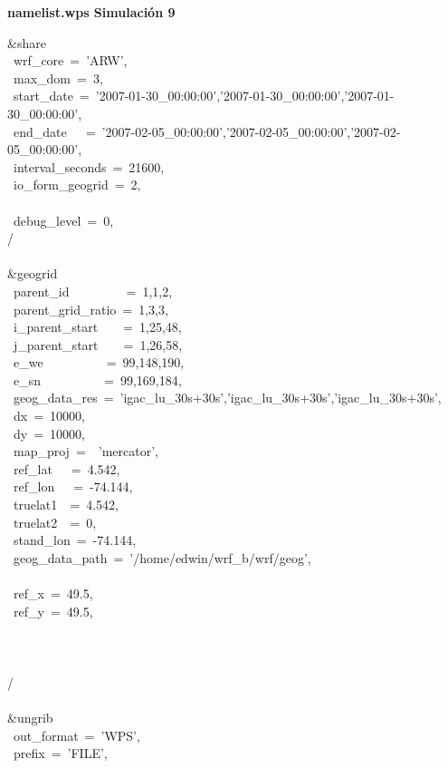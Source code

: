 
\textbf{namelist.wps Simulación 9}

\&share\\
~wrf\_core~=~'ARW',\\
~max\_dom~=~3,\\
~start\_date~=~'2007-01-30\_00:00:00','2007-01-30\_00:00:00','2007-01-30\_00:00:00',\\
~end\_date~~~=~'2007-02-05\_00:00:00','2007-02-05\_00:00:00','2007-02-05\_00:00:00',~\\
~interval\_seconds~=~21600,\\
~io\_form\_geogrid~=~2,\\
\\
~debug\_level~=~0,\\
/\\
\\
\&geogrid\\
~parent\_id~~~~~~~~~=~1,1,2,\\
~parent\_grid\_ratio~=~1,3,3,\\
~i\_parent\_start~~~~=~1,25,48,\\
~j\_parent\_start~~~~=~1,26,58,\\
~e\_we~~~~~~~~~~=~99,148,190,\\
~e\_sn~~~~~~~~~~=~99,169,184,\\
~geog\_data\_res~=~'igac\_lu\_30s+30s','igac\_lu\_30s+30s','igac\_lu\_30s+30s',\\
~dx~=~10000,\\
~dy~=~10000,\\
~map\_proj~=~~'mercator',\\
~ref\_lat~~~=~4.542,\\
~ref\_lon~~~=~-74.144,\\
~truelat1~~=~4.542,\\
~truelat2~~=~0,\\
~stand\_lon~=~-74.144,\\
~geog\_data\_path~=~'/home/edwin/wrf\_b/wrf/geog',\\
\\
~ref\_x~=~49.5,\\
~ref\_y~=~49.5,\\
\\
\\
\\
/\\
\\
\&ungrib\\
~out\_format~=~'WPS',\\
~prefix~=~'FILE',\\
